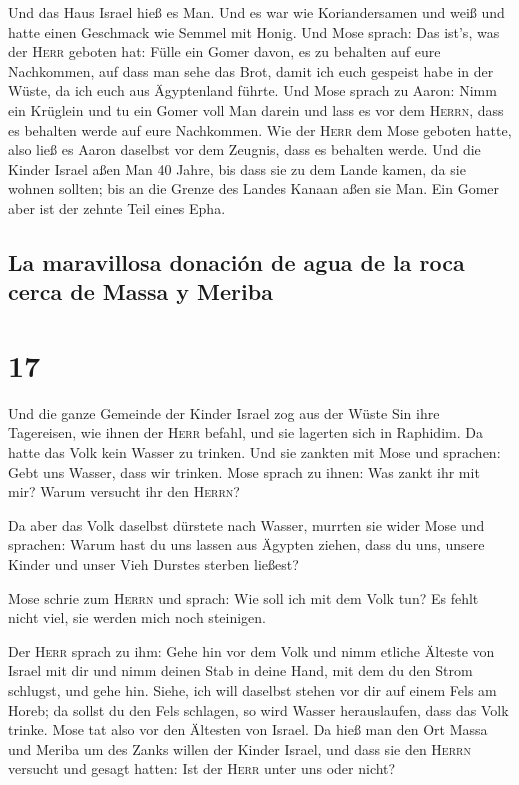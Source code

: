  Und das Haus Israel hieß es Man. Und es war wie
Koriandersamen und weiß und hatte einen Geschmack wie Semmel mit Honig.
 Und Mose sprach: Das ist's, was der \textsc{Herr}
geboten hat: Fülle ein Gomer davon, es zu behalten auf eure Nachkommen,
auf dass man sehe das Brot, damit ich euch gespeist habe in der Wüste,
da ich euch aus Ägyptenland führte.  Und Mose sprach zu
Aaron: Nimm ein Krüglein und tu ein Gomer voll Man darein und lass es
vor dem \textsc{Herrn}, dass es behalten werde auf eure Nachkommen.
 Wie der \textsc{Herr} dem Mose geboten hatte, also ließ
es Aaron daselbst vor dem Zeugnis, dass es behalten werde.
 Und die Kinder Israel aßen Man 40 Jahre, bis dass sie zu
dem Lande kamen, da sie wohnen sollten; bis an die Grenze des Landes
Kanaan aßen sie Man.  Ein Gomer aber ist der zehnte Teil
eines Epha.

\hypertarget{la-maravillosa-donaciuxf3n-de-agua-de-la-roca-cerca-de-massa-y-meriba}{%
\subsection{La maravillosa donación de agua de la roca cerca de Massa y
Meriba}\label{la-maravillosa-donaciuxf3n-de-agua-de-la-roca-cerca-de-massa-y-meriba}}

\hypertarget{section-16}{%
\section{17}\label{section-16}}

 Und die ganze Gemeinde der Kinder Israel zog aus der
Wüste Sin ihre Tagereisen, wie ihnen der \textsc{Herr} befahl, und sie
lagerten sich in Raphidim. Da hatte das Volk kein Wasser zu trinken.
 Und sie zankten mit Mose und sprachen: Gebt uns Wasser,
dass wir trinken. Mose sprach zu ihnen: Was zankt ihr mit mir? Warum
versucht ihr den \textsc{Herrn}?

 Da aber das Volk daselbst dürstete nach Wasser, murrten
sie wider Mose und sprachen: Warum hast du uns lassen aus Ägypten
ziehen, dass du uns, unsere Kinder und unser Vieh Durstes sterben
ließest?

 Mose schrie zum \textsc{Herrn} und sprach: Wie soll ich
mit dem Volk tun? Es fehlt nicht viel, sie werden mich noch steinigen.

 Der \textsc{Herr} sprach zu ihm: Gehe hin vor dem Volk
und nimm etliche Älteste von Israel mit dir und nimm deinen Stab in
deine Hand, mit dem du den Strom schlugst, und gehe hin. 
Siehe, ich will daselbst stehen vor dir auf einem Fels am Horeb; da
sollst du den Fels schlagen, so wird Wasser herauslaufen, dass das Volk
trinke. Mose tat also vor den Ältesten von Israel.  Da
hieß man den Ort Massa und Meriba um des Zanks willen der Kinder Israel,
und dass sie den \textsc{Herrn} versucht und gesagt hatten: Ist der
\textsc{Herr} unter uns oder nicht?

